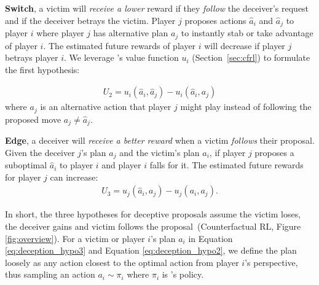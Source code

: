 \textbf{Switch}, a victim will \textit{receive a lower} reward if they \textit{follow} the deceiver's request and if the deceiver betrays the victim.
 Player \( j \) proposes actions \( \hat{a}_i \) and \( \hat{a}_j \) to player \( i \) where player \( j \) has alternative plan \( a_j \) to instantly stab or take advantage of player \( i \). The estimated future rewards of player \( i \) will decrease if player \( j \) betrays player \( i \). We leverage \cicero's  value function \( u_i \) (Section~\ref{sec:cfrl}) to formulate the first hypothesis:

\begin{equation}
    \begin{aligned}
        U_2 = u_i(\hat{a}_i, \hat{a}_j) - u_i(\hat{a}_i, a_j)
    \end{aligned}
    \label{eq:deception_hypo1}
\end{equation}
where \( a_j \) is an alternative action that player \(j\) might play instead of following the proposed move \( a_j \neq \hat{a}_j \). 


\textbf{Edge}, a deceiver will \textit{receive a better reward} when a victim \textit{follows} their proposal. Given the deceiver \( j \)'s plan \( a_j \)  and the victim's plan \( a_i\), if player \( j \) proposes a suboptimal \( \hat{a}_i \) to player \( i \) and player \( i \) falls for it. The estimated future rewards for player \( j \) can increase:  
\begin{equation}
    \begin{aligned}
        U_3 = u_j(\hat{a}_i, a_j) - u_j(a_i, a_j).
    \end{aligned}
    \label{eq:deception_hypo2}
\end{equation}

In short, the three hypotheses for deceptive proposals assume the victim loses, the deceiver gains and victim follows the proposal~(Counterfactual RL, Figure \ref{fig:overview}). For a victim or player \(i\)'s plan \( a_i\) in Equation \ref{eq:deception_hypo3} and Equation \ref{eq:deception_hypo2}, we define the plan loosely as any action closest to the optimal action from player \(i\)'s perspective, thus sampling an action \( a_i \sim \pi_i\) where \(\pi_i\) is \cicero{}'s policy.

